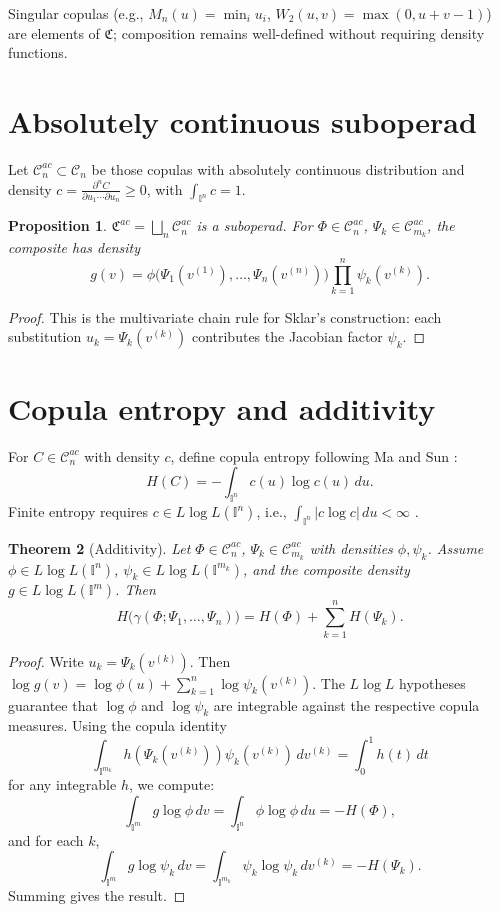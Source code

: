 \documentclass[11pt]{amsart}
\newtheorem{theorem}{Theorem}[section]
\newtheorem{proposition}[theorem]{Proposition}
\newcommand{\I}{\mathbb I}
\begin{document}
\begin{sloppypar}
Singular copulas (e.g., $M_{n}(u)=\min_{i}u_{i}$, $W_{2}(u,v)=\max(0,u+v-1)$) are elements of $\mathfrak{C}$; composition remains well-defined without requiring density functions.

\section{Absolutely continuous suboperad}
\label{sec:ac}
Let $\mathcal{C}_{n}^{ac}\subset\mathcal{C}_{n}$ be those copulas with absolutely continuous distribution and density $\displaystyle c=\frac{\partial^{n}C}{\partial u_{1}\cdots\partial u_{n}}\geq 0$, with $\displaystyle \int_{\I^{n}}c=1$.

\begin{proposition}
\label{prop:ac}
$\mathfrak{C}^{ac}=\bigsqcup_{n}\mathcal{C}_{n}^{ac}$ is a suboperad. For $\Phi\in\mathcal{C}_{n}^{ac}$, $\Psi_{k}\in\mathcal{C}_{m_{k}}^{ac}$, the composite has density
\[
g(v)=\phi\bigl(\Psi_{1}(v^{(1)}),\dots,\Psi_{n}(v^{(n)})\bigr)\prod_{k=1}^{n}\psi_{k}(v^{(k)}).
\]
\end{proposition}

\begin{proof}
This is the multivariate chain rule for Sklar's construction: each substitution $u_{k}=\Psi_{k}(v^{(k)})$ contributes the Jacobian factor $\psi_{k}$.
\end{proof}

\section{Copula entropy and additivity}
\label{sec:entropy}
For $C\in\mathcal{C}_{n}^{ac}$ with density $c$, define copula entropy following Ma and Sun \cite{masun}:
\[ \displaystyle H(C)=-\int_{\I^{n}}c(u)\log c(u)\,du. \]
Finite entropy requires $c\in L\log L(\I^{n})$, i.e., $\int_{\I^{n}}|c\log c|\,du<\infty$ \cite{rao-ren,bennett-sharpley}.

\begin{theorem}[Additivity]
\label{thm:add}
Let $\Phi\in\mathcal{C}_{n}^{ac}$, $\Psi_{k}\in\mathcal{C}_{m_{k}}^{ac}$ with densities $\phi,\psi_{k}$. Assume $\phi\in L\log L(\I^{n})$, $\psi_{k}\in L\log L(\I^{m_{k}})$, and the composite density $g\in L\log L(\I^{m})$. Then
\[ \displaystyle H\bigl(\gamma(\Phi;\Psi_{1},\dots,\Psi_{n})\bigr)=H(\Phi)+\sum_{k=1}^{n}H(\Psi_{k}). \]
\end{theorem}

\begin{proof}
Write $u_{k}=\Psi_{k}(v^{(k)})$. Then $\displaystyle \log g(v)=\log\phi(u)+\sum_{k=1}^{n}\log\psi_{k}(v^{(k)})$. The $L\log L$ hypotheses guarantee that $\log\phi$ and $\log\psi_{k}$ are integrable against the respective copula measures. Using the copula identity
\[ \displaystyle \int_{\I^{m_{k}}}h(\Psi_{k}(v^{(k)}))\psi_{k}(v^{(k)})\,dv^{(k)}=\int_{0}^{1}h(t)\,dt \]
for any integrable $h$, we compute:
\[ \displaystyle \int_{\I^{m}}g\log\phi\,dv=\int_{\I^{n}}\phi\log\phi\,du=-H(\Phi), \]
and for each $k$,
\[ \displaystyle \int_{\I^{m}}g\log\psi_{k}\,dv=\int_{\I^{m_{k}}}\psi_{k}\log\psi_{k}\,dv^{(k)}=-H(\Psi_{k}). \]
Summing gives the result.
\end{proof}


\end{sloppypar}
\end{document}
